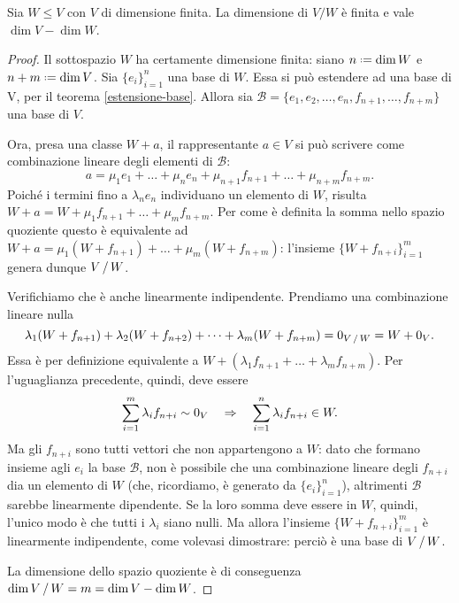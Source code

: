 \begin{teorema} \label{t:dimensione-quoziente}
	Sia $W\leq V$ con $V$ di dimensione finita.
	La dimensione di $V/W$ è finita e vale $\dim V-\dim W$.
\end{teorema}
\begin{proof}
	Il sottospazio $W$ ha certamente dimensione finita: siano $n\defeq\dim W$ e $n+m\defeq\dim V$.
	Sia $\{e_i\}_{i=1}^n$ una base di $W$.
	Essa si può estendere ad una base di V, per il teorema \ref{estensione-base}.
	Allora sia $\mathcal B=\{e_1,e_2,\dots,e_n,f_{n+1},\dots,f_{n+m}\}$ una base di $V$.

	Ora, presa una classe $W+a$, il rappresentante $a\in V$ si può scrivere come combinazione lineare degli elementi di $\mathcal B$:
	\begin{equation*}
		a=\mu_1e_1+\dots+\mu_ne_n+\mu_{n+1}f_{n+1}+\dots+\mu_{n+m}f_{n+m}.
	\end{equation*}
	Poich\'e i termini fino a $\lambda_ne_n$ individuano un elemento di $W$, risulta $W+a=W+\mu_1f_{n+1}+\dots+\mu_mf_{n+m}$.
	Per come è definita la somma nello spazio quoziente questo è equivalente ad $W+a=\mu_1(W+f_{n+1})+\dots+\mu_m(W+f_{n+m})$: l'insieme $\{W+f_{n+i}\}_{i=1}^m$ genera dunque $V\,/\, W$.

	Verifichiamo che è anche linearmente indipendente.
	Prendiamo una combinazione lineare nulla
	\begin{equation}
		\lambda_1(W+f_{n+1})+\lambda_2(W+f_{n+2})+\dots+\lambda_m(W+f_{n+m})=0_{V\,/\, W}=W+0_V.
	\end{equation}
	Essa è per definizione equivalente a $W+(\lambda_1f_{n+1}+\dots+\lambda_mf_{n+m})$.
	Per l'uguaglianza precedente, quindi, deve essere
	\begin{equation}
		\sum_{i=1}^m\lambda_if_{n+i}\sim 0_V\quad\Rightarrow\quad\sum_{i=1}^n\lambda_if_{n+i}\in W.
	\end{equation}
	Ma gli $f_{n+i}$ sono tutti vettori che non appartengono a $W$: dato che formano insieme agli $e_i$ la base $\mathcal B$, non è possibile che una combinazione lineare degli $f_{n+i}$ dia un elemento di $W$ (che, ricordiamo, è generato da $\{e_i\}_{i=1}^n$), altrimenti $\mathcal B$ sarebbe linearmente dipendente.
	Se la loro somma deve essere in $W$, quindi, l'unico modo è che tutti i $\lambda_i$ siano nulli.
	Ma allora l'insieme $\{W+f_{n+i}\}_{i=1}^m$ è linearmente indipendente, come volevasi dimostrare: perciò è una base di $V\,/\, W$.

	La dimensione dello spazio quoziente è di conseguenza $\dim V\,/\, W=m=\dim V-\dim W$.
\end{proof}

